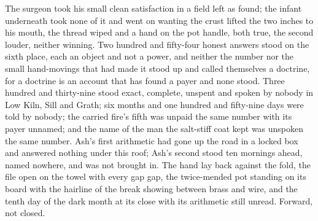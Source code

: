 The surgeon took his small clean satisfaction in a field left as found; the infant underneath took none of it and went on wanting the crust lifted the two inches to his mouth, the thread wiped and a hand on the pot handle, both true, the second louder, neither winning. Two hundred and fifty-four honest answers stood on the sixth place, each an object and not a power, and neither the number nor the small hand-movings that had made it stood up and called themselves a doctrine, for a doctrine is an account that has found a payer and none stood. Three hundred and thirty-nine stood exact, complete, unspent and spoken by nobody in Low Kiln, Sill and Grath; six months and one hundred and fifty-nine days were told by nobody; the carried fire's fifth was unpaid the same number with its payer unnamed; and the name of the man the salt-stiff coat kept was unspoken the same number. Ash's first arithmetic had gone up the road in a locked box and answered nothing under this roof; Ash's second stood ten mornings ahead, named nowhere, and was not brought in. The hand lay back against the fold, the file open on the towel with every gap gap, the twice-mended pot standing on its board with the hairline of the break showing between brass and wire, and the tenth day of the dark month at its close with its arithmetic still unread. Forward, not closed.
